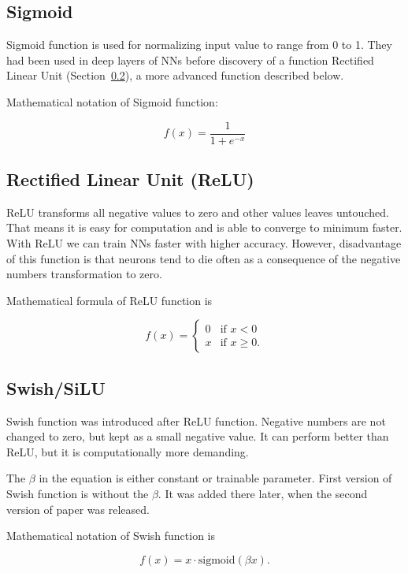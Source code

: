 \subsection{Sigmoid}%
\label{sub:sigmoid}

Sigmoid function is used for normalizing input value to range from 0 to 1. They had been used in deep layers of NNs before discovery of a function Rectified Linear Unit (Section~\ref{sub:relu}), a more advanced function described below.

Mathematical notation of Sigmoid function:

$$%
	f(x) = \frac{1}{1+e^{-x}}%
$$


\subsection{Rectified Linear Unit (ReLU)}%
\label{sub:relu}

ReLU transforms all negative values to zero and other values leaves untouched. That means it is easy for computation and is able to converge to minimum faster. With ReLU we can train NNs faster with higher accuracy. However, disadvantage of this function is that neurons tend to die often as a consequence of the negative numbers transformation to zero.

Mathematical formula of ReLU function is

$$%
	f(x) = \begin{cases} 0 & \text{if } x < 0 \\
						 x & \text{if } x \geq 0.%
			\end{cases}%
$$


\subsection{Swish/SiLU}%
\label{sub:swish_silu}

Swish function was introduced after ReLU function. Negative numbers are not changed to zero, but kept as a small negative value. It can perform better than ReLU, but it is computationally more demanding. \cite{swish}

The $\beta$ in the equation is either constant or trainable parameter. First version of Swish function is without the $\beta$. It was added there later, when the second version of paper \cite{swish} was released.

Mathematical notation of Swish function is

$$%
	f(x) = x \cdot \text{sigmoid}(\beta x).%
$$

